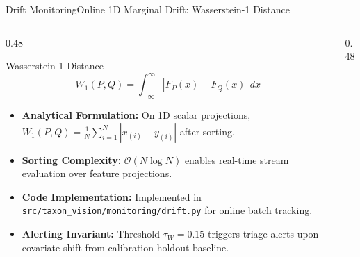 \begin{frame}[fragile]{Drift Monitoring}{Online 1D Marginal Drift: Wasserstein-1 Distance}
    \begin{columns}[T]
        \begin{column}{0.48\textwidth}
            \begin{block}{Wasserstein-1 Distance}
                \vspace{-0.15cm}
                {\footnotesize $$W_1(P, Q) = \int_{-\infty}^{\infty} |F_P(x) - F_Q(x)| \, dx$$}
                \vspace{-0.2cm}
                \begin{itemize}\tiny
                    \item \textbf{Analytical Formulation:} On 1D scalar projections, $W_1(P, Q) = \frac{1}{N}\sum_{i=1}^N |x_{(i)} - y_{(i)}|$ after sorting.
                    \item \textbf{Sorting Complexity:} $\mathcal{O}(N \log N)$ enables real-time stream evaluation over feature projections.
                    \item \textbf{Code Implementation:} Implemented in \texttt{src/taxon\_vision/monitoring/drift.py} for online batch tracking.
                    \item \textbf{Alerting Invariant:} Threshold $\tau_W = 0.15$ triggers triage alerts upon covariate shift from calibration holdout baseline.
                \end{itemize}
            \end{block}
        \end{column}
        \begin{column}{0.48\textwidth}
\end{column}
\end{columns}
\end{frame}
